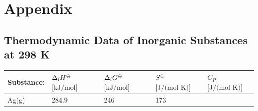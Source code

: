 \documentclass[
  9pt,
]{extbook}
\theoremstyle{definition}
\theoremstyle{definition}
\theoremstyle{definition}
\theoremstyle{remark}
\begin{document}
\renewcommand*{\standardstate}{{-\kern-6pt{\ominus}\kern-6pt-}}

\hypertarget{appendix}{%
\chapter{Appendix}\label{appendix}}

\hypertarget{thermodynamic-data-of-inorganic-substances-at-298-k}{%
\section{Thermodynamic Data of Inorganic Substances at 298 K}\label{thermodynamic-data-of-inorganic-substances-at-298-k}}

\tiny

\begin{longtable}[]{@{}lllll@{}}
\toprule
\begin{minipage}[b]{0.10\columnwidth}\raggedright
Substance:\strut
\end{minipage} & \begin{minipage}[b]{0.19\columnwidth}\raggedright
\(\Delta_{\text{f}} H^{-\kern-6pt{\ominus}\kern-6pt-}\)
\(\scriptstyle{\text{[kJ/mol]}}\)\strut
\end{minipage} & \begin{minipage}[b]{0.20\columnwidth}\raggedright
\(\Delta_{\text{f}} G^{-\kern-6pt{\ominus}\kern-6pt-}\)
\(\scriptstyle{\text{[kJ/mol]}}\)\strut
\end{minipage} & \begin{minipage}[b]{0.18\columnwidth}\raggedright
\(S^{-\kern-6pt{\ominus}\kern-6pt-}\)
\(\scriptstyle{\text{[J/(mol K)]}}\)\strut
\end{minipage} & \begin{minipage}[b]{0.18\columnwidth}\raggedright
\(C_P\)
\(\scriptstyle{\text{[J/(mol K)]}}\)\strut
\end{minipage}\tabularnewline
\midrule
\endhead
\begin{minipage}[t]{0.10\columnwidth}\raggedright
Ag(g)\strut
\end{minipage} & \begin{minipage}[t]{0.19\columnwidth}\raggedright
284.9\strut
\end{minipage} & \begin{minipage}[t]{0.20\columnwidth}\raggedright
246\strut
\end{minipage} & \begin{minipage}[t]{0.18\columnwidth}\raggedright
173\strut
\end{minipage} & \begin{minipage}[t]{0.18\columnwidth}\raggedright

\end{minipage}
\end{longtable}
\end{document}

